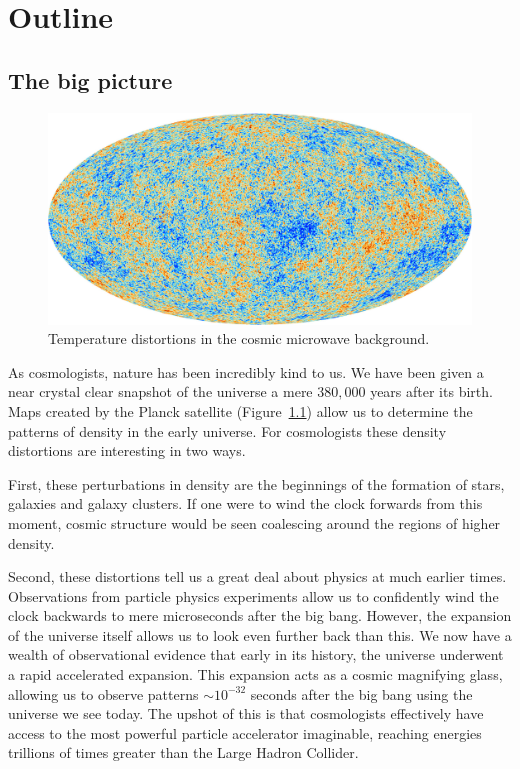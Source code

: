 \chapter{Outline}
\label{chap:out}

\section{The big picture}
\begin{figure}[tp]
  \includegraphics[width=\textwidth]{chapters/outline/figures/planck}
  \caption{Temperature distortions in the cosmic microwave background.}\label{fig:out:planck}
\end{figure}

As cosmologists, nature has been incredibly kind to us. We have been given a near crystal clear snapshot of the universe a mere \(380,000\) years after its birth. Maps created by the Planck satellite (Figure~\ref{fig:out:planck}) allow us to determine the patterns of density in the early universe. For cosmologists these density distortions are interesting in two ways. 

First, these perturbations in density are the beginnings of the formation of stars, galaxies and galaxy clusters. If one were to wind the clock forwards from this moment, cosmic structure would be seen coalescing around the regions of higher density.

Second, these distortions tell us a great deal about physics at much earlier times. Observations from particle physics experiments allow us to confidently wind the clock backwards to mere microseconds after the big bang.
However, the expansion of the universe itself allows us to look even further back than this. We now have a wealth of observational evidence that early in its history, the universe underwent a rapid accelerated expansion. This expansion acts as a cosmic magnifying glass, allowing us to observe patterns \(\sim10^{-32}\) seconds after the big bang using the universe we see today. The upshot of this is that cosmologists effectively have access to the most powerful particle accelerator imaginable, reaching energies trillions of times greater than the Large Hadron Collider. 

